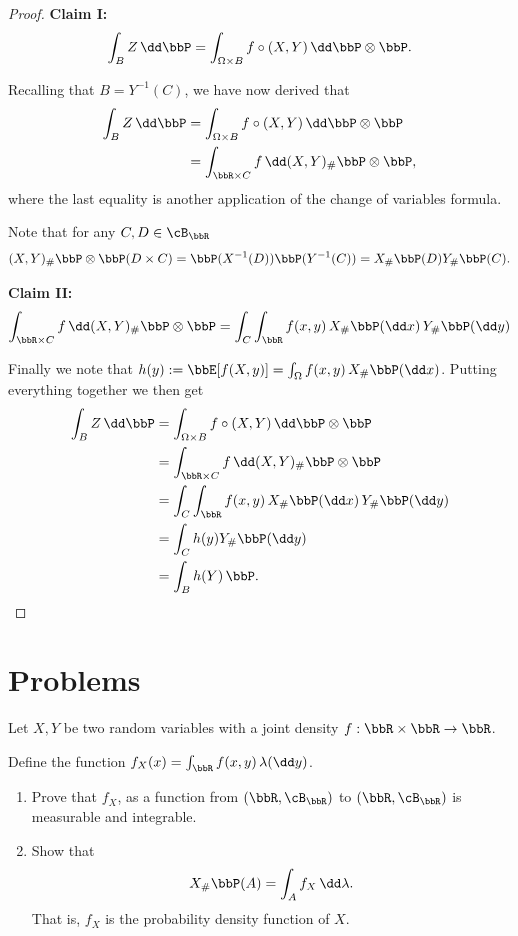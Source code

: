 \begin{proof}
\textbf{Claim I:}
\[
	\int_{B} Z \, \dd \bbP = \int_{\Omega \times B} f \circ (X,Y) \, \dd \bbP \otimes \bbP.
\]

Recalling that $B = Y^{-1}(C)$, we have now derived that
\begin{align*}
	\int_{B} Z \, \dd \bbP &= \int_{\Omega \times B} f \circ (X,Y) \, \dd \bbP \otimes \bbP\\
	&= \int_{\bbR \times C} f \, \dd (X,Y)_\# \bbP \otimes \bbP,
\end{align*}
where the last equality is another application of the change of variables formula.

Note that for any $C, D \in \cB_{\bbR}$
\[
	(X,Y)_\# \bbP \otimes \bbP(D \times C) = \bbP(X^{-1}(D)) \bbP(Y^{-1}(C)) 
	= X_\# \bbP(D) Y_\# \bbP(C).
\]

\textbf{Claim II:}
\[
	\int_{\bbR \times C} f \, \dd (X,Y)_\# \bbP \otimes \bbP
	= \int_C \int_\bbR f(x,y) \, X_\#\bbP(\dd x) \, Y_\# \bbP (\dd y)
\]

Finally we note that $h(y) := \bbE[f(X,y)] = \int_\Omega f(x,y) \, X_\#\bbP(\dd x)$. Putting everything together we then get
\begin{align*}
	\int_{B} Z \, \dd \bbP &= \int_{\Omega \times B} f \circ (X,Y) \, \dd \bbP \otimes \bbP\\
	&= \int_{\bbR \times C} f \, \dd (X,Y)_\# \bbP \otimes \bbP\\
	&= \int_C \int_\bbR f(x,y) \, X_\#\bbP(\dd x) \, Y_\# \bbP (\dd y)\\
	&= \int_C h(y) Y_\# \bbP(\dd y) \\
	&= \int_B h(Y) \, \bbP.
\end{align*}

\end{proof}


\section{Problems}


\begin{problem}\label{prb:joint_pdfs}
Let $X,Y$ be two random variables with a joint density $f : \bbR \times \bbR \to \bbR$. 

Define the function $f_X(x) = \int_\bbR f(x,y) \, \lambda(\dd y)$.
\begin{enumerate}[label={(\alph*)}]
\item Prove that $f_X$, as a function from $(\bbR, \cB_{\bbR})$ to $(\bbR, \cB_{\bbR})$ is measurable and integrable.
\item Show that
\[
	X_\# \bbP (A) = \int_A f_X \, \dd \lambda.
\]
That is, $f_X$ is the probability density function of $X$.
\end{enumerate}
\end{problem}

